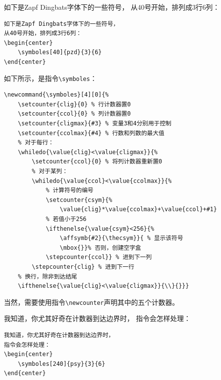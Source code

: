 \begin{codelist}[9.11]{
如下是Zapf Dingbats字体下的一些符号，
从40号开始，排列成3行6列：
\begin{center}
\end{center}
}
\begin{verbatim}
如下是Zapf Dingbats字体下的一些符号，
从40号开始，排列成3行6列：
\begin{center}
    \symboles[40]{pzd}{3}{6}
\end{center}\end{verbatim}
\end{codelist}

如下所示，是指令\verb|\symboles|：

\begin{dmd}
\begin{verbatim}
\newcommand{\symboles}[4][0]{%
    \setcounter{clig}{0} % 行计数器置0
    \setcounter{ccol}{0} % 列计数器置0
    \setcounter{cligmax}{#3} % 变量3和4分别用于控制
    \setcounter{ccolmax}{#4} % 行数和列数的最大值
    % 对于每行：
    \whiledo{\value{clig}<\value{cligmax}}{%
        \setcounter{ccol}{0} % 将列计数器重新置0
        % 对于某列： 
        \whiledo{\value{ccol}<\value{ccolmax}}{%
            % 计算符号的编号
            \setcounter{csym}{%
                \value{clig}*\value{ccolmax}+\value{ccol}+#1}
            % 若值小于256 
            \ifthenelse{\value{csym}<256}{%
                \affsymb{#2}{\thecsym}}{ % 显示该符号
                \mbox{}}% 否则，创建空字盒
            \stepcounter{ccol}} % 进到下一列
        \stepcounter{clig} % 进到下一行
    % 换行，除非到达结尾
    \ifthenelse{\value{clig}<\value{cligmax}}{\\}{}}}\end{verbatim}
\end{dmd}

当然，需要使用指令\verb|\newcounter|声明其中的五个计数器。

\begin{codelist}[9.12]{
    我知道，你尤其好奇在计数器到达边界时，
    指令会怎样处理：
\begin{center}
\end{center}
}
\begin{verbatim}
我知道，你尤其好奇在计数器到达边界时，
指令会怎样处理：
\begin{center}
    \symboles[240]{psy}{3}{6}
\end{center}\end{verbatim}
\end{codelist}


